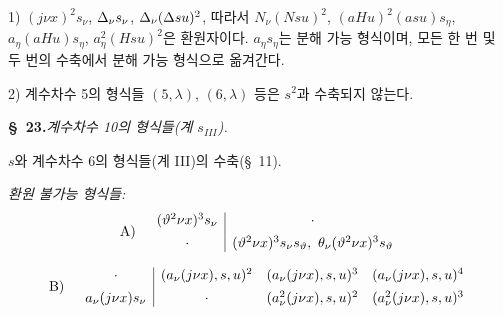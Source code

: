 1) $(j\nu x)^2s_\nu$, $\Delta_\nu s_\nu$, $\Delta_\nu(\Delta su)^2$, 따라서 $N_\nu(Nsu)^2$, $(aHu)^2(asu)s_\eta$, $a_\eta(aHu)s_\eta$, $a_\eta^2(Hsu)^2$은 환원자이다. $a_\eta s_\eta$는 분해 가능 형식이며, 모든 한 번 및 두 번의 수축에서 분해 가능 형식으로 옮겨간다.

2) 계수차수 5의 형식들 $(5,\lambda)$, $(6,\lambda)$ 등은 $s^2$과 수축되지 않는다.

\begin{center}
\textbf{\S\ 23.}\quad\emph{계수차수 10의 형식들(계 $s_{III}$).}
\end{center}

$s$와 계수차수 6의 형식들(계 III)의 수축(\S\ 11).

\noindent\emph{환원 불가능 형식들:}
\[
\begin{array}{r@{\quad}c}
\text{A)}&
\begin{array}{c|c}
(\vartheta^2\nu x)^3s_\nu&\cdot\\[0.45em]
\cdot&(\vartheta^2\nu x)^3s_\nu s_\vartheta,\ \theta_\nu(\vartheta^2\nu x)^3s_\vartheta
\end{array}
\end{array}
\]

\[
\begin{array}{r@{\quad}c}
\text{B)}&
\begin{array}{c|ccc}
\cdot&(a_\nu(j\nu x),s,u)^2&(a_\nu(j\nu x),s,u)^3&(a_\nu(j\nu x),s,u)^4\\[0.45em]
a_\nu(j\nu x)s_\nu&\cdot&(a_\nu^2(j\nu x),s,u)^2&(a_\nu^2(j\nu x),s,u)^3
\end{array}
\end{array}
\]

